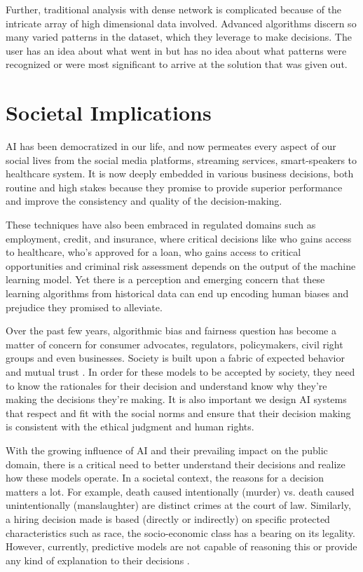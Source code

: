 Further, traditional analysis with dense network is complicated because of the intricate array of high dimensional data involved. Advanced algorithms discern so many varied patterns in the dataset, which they leverage to make decisions. The user has an idea about what went in but has no idea about what patterns were recognized or were most significant to arrive at the solution that was given out.

\section{Societal Implications}

AI has been democratized in our life, and now permeates every aspect of our social lives from the social media platforms, streaming services, smart-speakers to healthcare system. It is now deeply embedded in various business decisions, both routine and high stakes because they promise to provide superior performance and improve the consistency and quality of the decision-making. 

These techniques have also been embraced in regulated domains such as employment, credit, and insurance, where critical decisions like who gains access to healthcare, who’s approved for a loan, who gains access to critical opportunities and criminal risk assessment \cite{ainow2018} depends on the output of the machine learning model. Yet there is a perception and emerging concern that these learning algorithms from historical data can end up encoding human biases and prejudice they promised to alleviate.

Over the past few years, algorithmic bias and fairness question has become a matter of concern for consumer advocates, regulators, policymakers, civil right groups and even businesses. Society is built upon a fabric of expected behavior and mutual trust \cite{Lipton2018}. In order for these models to be accepted by society, they need to know the rationales for their decision and understand know why they’re making the decisions they’re making. It is also important we design AI systems that respect and fit with the social norms and ensure that their decision making is consistent with the ethical judgment and human rights.

With the growing influence of AI and their prevailing impact on the public domain, there is a critical need to better understand their decisions and realize how these models operate.  In a societal context, the reasons for a decision matters a lot. For example, death caused intentionally (murder) vs. death caused unintentionally (manslaughter) are distinct crimes at the court of law. Similarly, a hiring decision made is based (directly or indirectly) on specific protected characteristics such as race, the socio-economic class has a bearing on its legality. However, currently, predictive models are not capable of reasoning this or provide any kind of explanation to their decisions \cite{molnar}.

